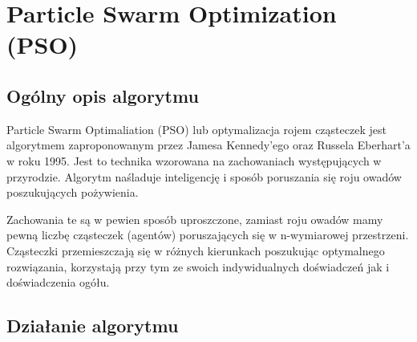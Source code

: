 
\section{Particle Swarm Optimization (PSO)}
\author{Paweł Jastrzębski}
\subsection{Ogólny opis algorytmu}
\par Particle Swarm Optimaliation (PSO) lub optymalizacja rojem cząsteczek jest algorytmem zaproponowanym przez Jamesa Kennedy'ego oraz Russela Eberhart'a w roku 1995. Jest to technika wzorowana na zachowaniach występujących w przyrodzie. Algorytm naśladuje inteligencję i sposób poruszania się roju owadów poszukujących pożywienia.
\par Zachowania te są w pewien sposób uproszczone, zamiast roju owadów mamy pewną liczbę cząsteczek (agentów) poruszających się w n-wymiarowej przestrzeni. Cząsteczki przemieszczają się w różnych kierunkach poszukując optymalnego rozwiązania, korzystają przy tym ze swoich indywidualnych doświadczeń jak i doświadczenia ogółu.
\subsection{Działanie algorytmu}
